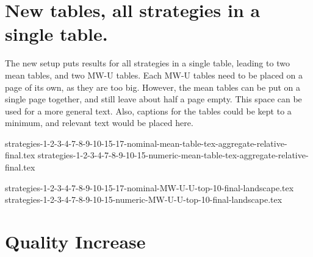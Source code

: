 \documentclass[smallextended]{svjour3}
\begin{document}






\clearpage
\pagebreak
\appendix

\section{New tables, all strategies in a single table.}
\label{appendix:tables}

The new setup puts results for all strategies in a single table, leading to two mean tables, and two MW-U tables.
Each MW-U tables need to be placed on a page of its own, as they are too big.
However, the mean tables can be put on a single page together, and still leave about half a page empty.
This space can be used for a more general text.
Also, captions for the tables could be kept to a minimum, and relevant text would be placed here.

{strategies-1-2-3-4-7-8-9-10-15-17-nominal-mean-table-tex-aggregate-relative-final.tex}
{strategies-1-2-3-4-7-8-9-10-15-numeric-mean-table-tex-aggregate-relative-final.tex}

\begin{landscape}
{strategies-1-2-3-4-7-8-9-10-15-17-nominal-MW-U-U-top-10-final-landscape.tex}
{strategies-1-2-3-4-7-8-9-10-15-numeric-MW-U-U-top-10-final-landscape.tex}
\end{landscape}

\section{Quality Increase}
\label{appendix:quality-increase}
\end{document}
